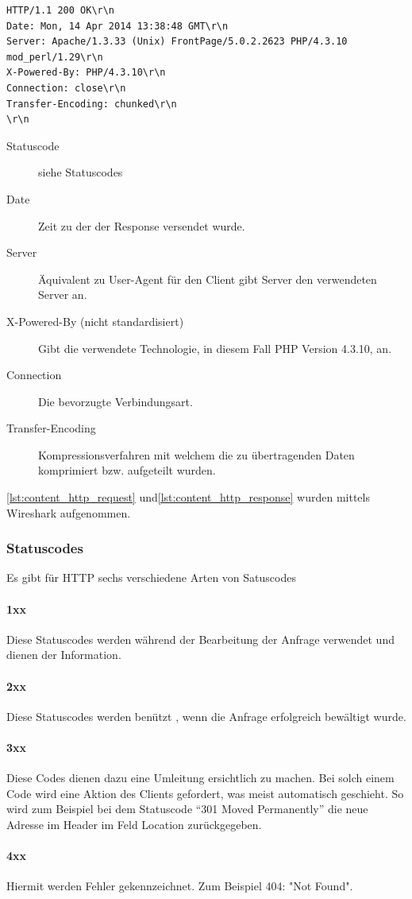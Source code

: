 \begin{lstlisting}[style=custom, caption={HTTP-Response},label={lst:content_http_response}]
HTTP/1.1 200 OK\r\n
Date: Mon, 14 Apr 2014 13:38:48 GMT\r\n
Server: Apache/1.3.33 (Unix) FrontPage/5.0.2.2623 PHP/4.3.10 mod_perl/1.29\r\n
X-Powered-By: PHP/4.3.10\r\n
Connection: close\r\n
Transfer-Encoding: chunked\r\n
\r\n
\end{lstlisting}
\begin{description}
\item[Statuscode] siehe Statuscodes
\item[Date] Zeit zu der der Response versendet wurde.
\item[Server] Äquivalent zu User-Agent für den Client gibt Server den verwendeten Server an. 
\item[X-Powered-By (nicht standardisiert)] Gibt die verwendete Technologie, in diesem Fall PHP Version 4.3.10, an. 
\item[Connection] Die bevorzugte Verbindungsart.
\item[Transfer-Encoding] Kompressionsverfahren mit welchem die zu übertragenden Daten komprimiert bzw. aufgeteilt wurden.
\end{description}
\autoref{lst:content_http_request} und\autoref{lst:content_http_response} wurden mittels Wireshark aufgenommen.
\subsubsection{Statuscodes}
Es gibt für HTTP sechs verschiedene Arten von Satuscodes
\paragraph{1xx}
Diese Statuscodes werden während der Bearbeitung der Anfrage verwendet und dienen der Information.
\paragraph{2xx}
Diese Statuscodes werden benützt , wenn die Anfrage erfolgreich bewältigt wurde.  
\paragraph{3xx}
Diese Codes dienen dazu eine Umleitung ersichtlich zu machen. Bei solch einem Code wird eine Aktion des Clients gefordert, was meist automatisch geschieht. So wird zum Beispiel bei dem Statuscode \enquote{301 Moved Permanently} die neue Adresse im Header im Feld Location zurückgegeben.
\paragraph{4xx}
Hiermit werden Fehler gekennzeichnet. Zum Beispiel 404: "Not Found".
